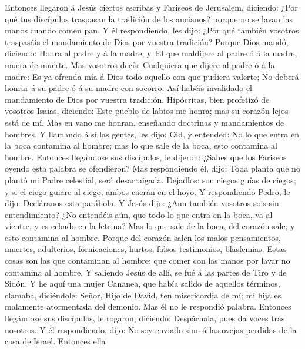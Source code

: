  Entonces llegaron á Jesús ciertos escribas y Fariseos de
Jerusalem, diciendo:  ¿Por qué tus discípulos traspasan la
tradición de los ancianos? porque no se lavan las manos cuando comen
pan.  Y él respondiendo, les dijo: ¿Por qué también vosotros
traspasáis el mandamiento de Dios por vuestra tradición? 
Porque Dios mandó, diciendo: Honra al padre y á la madre, y, El que
maldijere al padre ó á la madre, muera de muerte.  Mas
vosotros decís: Cualquiera que dijere al padre ó á la madre: Es ya
ofrenda mía á Dios todo aquello con que pudiera valerte;  No
deberá honrar á su padre ó á su madre con socorro. Así habéis invalidado
el mandamiento de Dios por vuestra tradición.  Hipócritas,
bien profetizó de vosotros Isaías, diciendo:  Este pueblo de
labios me honra; mas su corazón lejos está de mí.  Mas en
vano me honran, enseñando doctrinas y mandamientos de hombres.
 Y llamando á sí las gentes, les dijo: Oid, y entended:
 No lo que entra en la boca contamina al hombre; mas lo que
sale de la boca, esto contamina al hombre.  Entonces
llegándose sus discípulos, le dijeron: ¿Sabes que los Fariseos oyendo
esta palabra se ofendieron?  Mas respondiendo él, dijo:
Toda planta que no plantó mi Padre celestial, será desarraigada.
 Dejadlos: son ciegos guías de ciegos; y si el ciego guiare
al ciego, ambos caerán en el hoyo.  Y respondiendo Pedro,
le dijo: Decláranos esta parábola.  Y Jesús dijo: ¿Aun
también vosotros sois sin entendimiento?  ¿No entendéis
aún, que todo lo que entra en la boca, va al vientre, y es echado en la
letrina?  Mas lo que sale de la boca, del corazón sale; y
esto contamina al hombre.  Porque del corazón salen los
malos pensamientos, muertes, adulterios, fornicaciones, hurtos, falsos
testimonios, blasfemias.  Estas cosas son las que
contaminan al hombre: que comer con las manos por lavar no contamina al
hombre.  Y saliendo Jesús de allí, se fué á las partes de
Tiro y de Sidón.  Y he aquí una mujer Cananea, que había
salido de aquellos términos, clamaba, diciéndole: Señor, Hijo de David,
ten misericordia de mí; mi hija es malamente atormentada del demonio.
 Mas él no le respondió palabra. Entonces llegándose sus
discípulos, le rogaron, diciendo: Despáchala, pues da voces tras
nosotros.  Y él respondiendo, dijo: No soy enviado sino á
las ovejas perdidas de la casa de Israel.  Entonces ella
